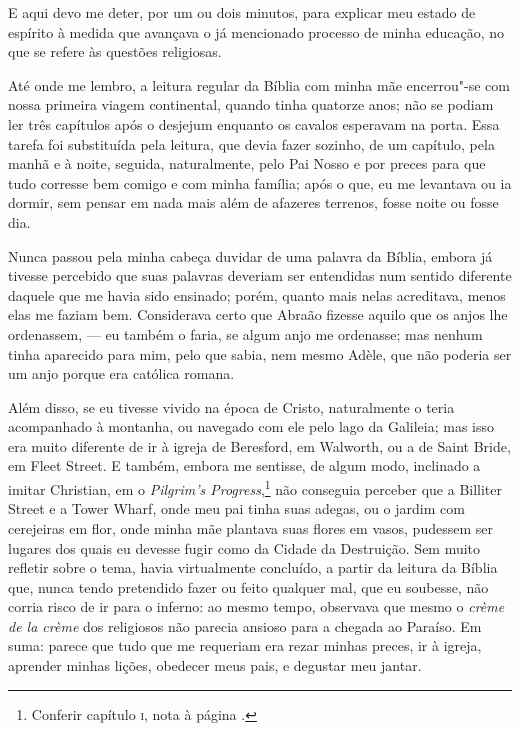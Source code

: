 E aqui devo me deter, por um ou dois minutos, para explicar meu
estado de espírito à medida que avançava o já mencionado processo de
minha educação, no que se refere às questões religiosas.

Até onde me lembro, a leitura regular da Bíblia com minha mãe
encerrou"-se com nossa primeira viagem continental, quando tinha quatorze
anos; não se podiam ler três capítulos após o desjejum enquanto os
cavalos esperavam na porta. Essa tarefa foi substituída pela leitura,
que devia fazer sozinho, de um capítulo, pela manhã e à noite, seguida,
naturalmente, pelo Pai Nosso e por preces para que tudo corresse bem
comigo e com minha família; após o que, eu me levantava ou ia dormir,
sem pensar em nada mais além de afazeres terrenos, fosse noite ou fosse
dia.

Nunca passou pela minha cabeça duvidar de uma palavra da Bíblia, embora
já tivesse percebido que suas palavras deveriam ser entendidas num
sentido diferente daquele que me havia sido ensinado; porém, quanto mais
nelas acreditava, menos elas me faziam bem. Considerava certo que Abraão
fizesse aquilo que os anjos lhe ordenassem, --- eu também o faria, se
algum anjo me ordenasse; mas nenhum tinha aparecido para mim, pelo que
sabia, nem mesmo Adèle, que não poderia ser um anjo porque era católica
romana.

Além disso, se eu tivesse vivido na época de Cristo, naturalmente o
teria acompanhado à montanha, ou navegado com ele pelo lago da Galileia;
mas isso era muito diferente de ir à igreja de Beresford, em Walworth,
ou a de Saint Bride, em Fleet Street. E também, embora me sentisse, de
algum modo, inclinado a imitar Christian, em o \textit{Pilgrim's
Progress},\footnote{Conferir capítulo \textsc{i}, nota à página \pageref{peregrino}.} não
conseguia perceber que a Billiter Street e a Tower Wharf, onde meu pai
tinha suas adegas, ou o jardim com cerejeiras em flor, onde minha mãe
plantava suas flores em vasos, pudessem ser lugares dos quais eu devesse
fugir como da Cidade da Destruição. Sem muito refletir sobre o tema,
havia virtualmente concluído, a partir da leitura da Bíblia que, nunca
tendo pretendido fazer ou feito qualquer mal, que eu soubesse, não
corria risco de ir para o inferno: ao mesmo tempo, observava que mesmo o
\textit{crème de la crème} dos religiosos não parecia ansioso para a
chegada ao Paraíso. Em suma: parece que tudo que me requeriam era rezar
minhas preces, ir à igreja, aprender minhas lições, obedecer meus pais,
e degustar meu jantar.

